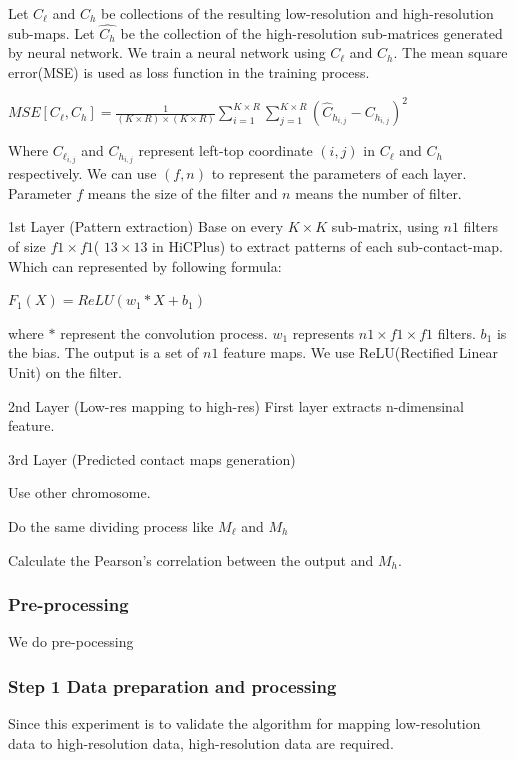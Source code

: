 \documentclass{article}
\begin{document}
\noindent Let $C_\ell$ and $C_h$ be collections of the resulting low-resolution and high-resolution
sub-maps. Let $\hat{C_h}$ be the collection of the high-resolution sub-matrices generated by neural network. We train a neural network using $C_\ell$ and $C_h$. The mean square error(MSE) is used as 
loss function in the training process. 



\begin{center}
    $MSE[C_\ell, C_h] = \frac{1}{(K \times R)\times (K \times R)} \sum_{i=1}^{K \times R} \sum_{j=1}^{K \times R} (\hat{C}_{h_{i,j}}-C_{h_{i,j}})^2$
\end{center}
Where $C_{\ell_{i,j}}$ and $C_{h_{i,j}}$ represent left-top coordinate $(i,j)$ in $C_\ell$ and $C_h$ respectively.
\noindent We can use $(f,n)$ to represent the parameters of each layer. Parameter $f$ means the size of the filter and $n$ means the number of filter. 


\noindent \large 1st Layer (Pattern extraction)
Base on every $K \times K$ sub-matrix, using $n1$ filters of size $f1 \times f1$( $13 \times 13$ in HiCPlus)
to extract patterns of each sub-contact-map. Which can represented by following formula:
\begin{center}
$F_1(X) = ReLU(w_1 * X + b_1)$
\end{center}
where $*$ represent the convolution process. $w_1$ represents $n1 \times f1 \times f1$ filters. $b_1$ is the bias. The output is a set of $n1$ feature maps. We use ReLU(Rectified Linear Unit) on the filter.
 

\noindent 2nd Layer (Low-res mapping to high-res)
First layer extracts n-dimensinal feature.


\noindent 3rd Layer (Predicted contact maps generation)


Use other chromosome. 

Do the same dividing process like $M_\ell$ and $M_h$

Calculate the Pearson's correlation between the output and $M_h$.






\subsubsection*{Pre-processing}
We do pre-pocessing
\subsubsection*{Step 1 Data preparation and processing}
Since this experiment is to validate the algorithm for mapping low-resolution data to high-resolution data, 
high-resolution data are required. 
\end{document}
